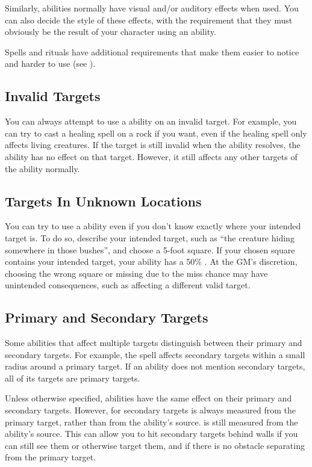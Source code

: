     Similarly, abilities normally have visual and/or auditory effects when used.
    You can also decide the style of these effects, with the requirement that they must obviously be the result of your character using an ability.

    Spells and rituals have additional requirements that make them easier to notice and harder to use (see ).

  \subsection{Invalid Targets}
    You can always attempt to use a  ability on an invalid target.
    For example, you can try to cast a healing spell on a rock if you want, even if the healing spell only affects living creatures.
    If the target is still invalid when the ability resolves, the ability has no effect on that target.
    However, it still affects any other targets of the ability normally.

  \subsection{Targets In Unknown Locations}
    You can try to use a  ability even if you don't know exactly where your intended target is.
    To do so, describe your intended target, such as ``the creature hiding somewhere in those bushes'', and choose a 5-foot square.
    If your chosen square contains your intended target, your ability has a 50\% .
    At the GM's discretion, choosing the wrong square or missing due to the miss chance may have unintended consequences, such as affecting a different valid target.

  \subsection{Primary and Secondary Targets}\label{Primary and Secondary Targets}
    Some abilities that affect multiple targets distinguish between their primary and secondary targets.
    For example, the  spell affects secondary targets within a small radius around a primary target.
    If an ability does not mention secondary targets, all of its targets are primary targets.

    Unless otherwise specified, abilities have the same effect on their primary and secondary targets.
    However,  for secondary targets is always measured from the primary target, rather than from the ability's source.
     is still measured from the ability's source.
    This can allow you to hit secondary targets behind walls if you can still see them or otherwise target them, and if there is no obstacle separating from the primary target.

